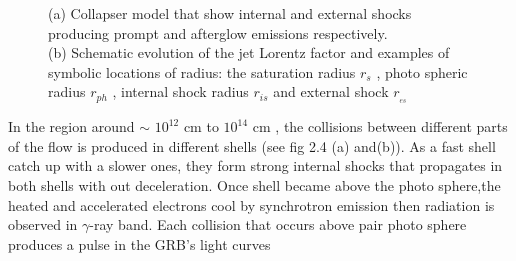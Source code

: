 \begin{figure}[hpbt]
\caption{(a) Collapser model that show internal and external shocks producing prompt and afterglow emissions respectively. \\ (b) Schematic evolution of the jet Lorentz factor and examples of symbolic locations of radius: the saturation radius $r_{s} $ , photo spheric radius $r_{ph} $ , internal shock radius $ r_{is} $ and external shock $ r_{_{es}} $}
\label{GRB prompt emission}
\end{figure}
In the region around $ \sim $ $ 10^{12} $ cm to  $ 10^{14} $ cm , the collisions between different parts of the flow is produced in different shells (see fig 2.4 (a) and(b)). As a fast shell catch up with a slower ones, they form strong internal shocks that propagates in both shells with out deceleration. Once shell became above the photo sphere,the heated and accelerated electrons cool by synchrotron emission then radiation is observed in $ \gamma $-ray band. Each collision that occurs above pair photo sphere produces a pulse in the GRB’s light curves\citep{22}\\
